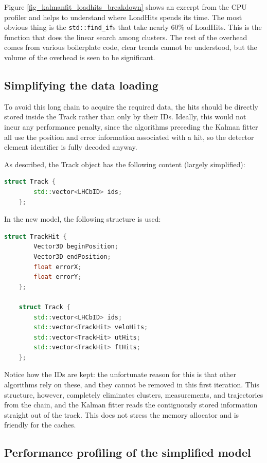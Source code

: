 \documentclass[12pt]{article}
\newcommand{\code}[1]{\texttt{#1}}
\begin{document}
Figure \ref{fig_kalmanfit_loadhits_breakdown} shows an excerpt from the CPU profiler and helps to understand where LoadHits spends its time. The most obvious thing is the \code{std::find\_if}s that take nearly 60\% of LoadHits. This is the function that does the linear search among clusters. The rest of the overhead comes from various boilerplate code, clear trends cannot be understood, but the volume of the overhead is seen to be significant.


\subsection{Simplifying the data loading}

To avoid this long chain to acquire the required data, the hits should be directly stored inside the Track rather than only by their IDs. Ideally, this would not incur any performance penalty, since the algorithms preceding the Kalman fitter all use the position and error information associated with a hit, so the detector element identifier is fully decoded anyway.

As described, the Track object has the following content (largely simplified):
\begin{lstlisting}[language=C++]
	struct Track {
		std::vector<LHCbID> ids;
	};
\end{lstlisting}

In the new model, the following structure is used:
\begin{lstlisting}[language=C++]
	struct TrackHit {
		Vector3D beginPosition;
		Vector3D endPosition;
		float errorX;
		float errorY;
	};
	
	struct Track {
		std::vector<LHCbID> ids;
		std::vector<TrackHit> veloHits;
		std::vector<TrackHit> utHits;
		std::vector<TrackHit> ftHits;
	};
\end{lstlisting}

Notice how the IDs are kept: the unfortunate reason for this is that other algorithms rely on these, and they cannot be removed in this first iteration. This structure, however, completely eliminates clusters, measurements, and trajectories from the chain, and the Kalman fitter reads the contiguously stored information straight out of the track. This does not stress the memory allocator and is friendly for the caches.


\subsection{Performance profiling of the simplified model}
\end{document}
